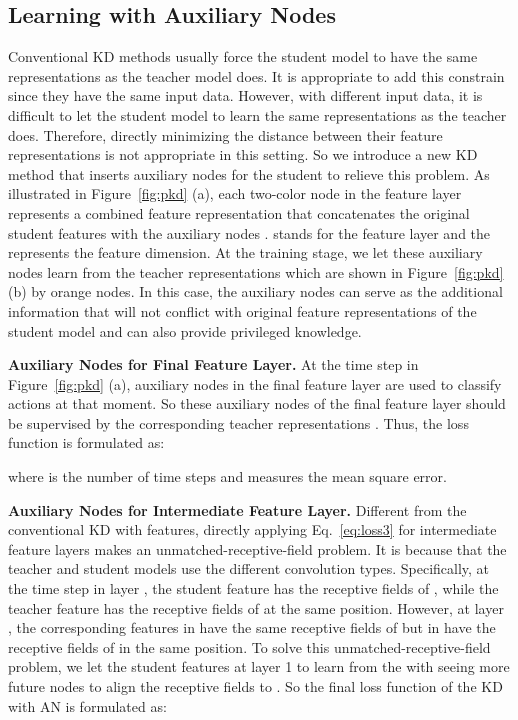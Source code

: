 \documentclass[final]{cvpr}
\begin{document}
\subsection{Learning with Auxiliary Nodes}

Conventional KD methods usually force the student model to have the same representations as the teacher model does. It is appropriate to add this constrain since they have the same input data. However, with different input data, it is difficult to let the student model  to learn the same representations as the teacher does. Therefore, directly minimizing the distance between their feature representations is not appropriate in this setting. So we introduce a new KD method that inserts auxiliary nodes for the student to relieve this problem. As illustrated in Figure~\ref{fig:pkd} (a), each two-color node in the feature layer represents a combined feature representation that concatenates the original student features  with the auxiliary nodes .  stands for the feature layer and the  represents the feature dimension. At the training stage, we let these auxiliary nodes learn from the teacher representations  which are shown in Figure~\ref{fig:pkd} (b) by orange nodes. In this case, the auxiliary nodes can serve as the additional information that will not conflict with original feature representations of the student model and can also provide privileged knowledge. 

\noindent \textbf{Auxiliary Nodes for Final Feature Layer.} 
At the time step  in Figure~\ref{fig:pkd} (a), auxiliary nodes  in the final feature layer are used to classify actions at that moment. So these auxiliary nodes of the final feature layer should be supervised by the corresponding teacher representations . Thus, the loss function is formulated as:

where  is the number of time steps and  measures the mean square error.

\noindent \textbf{Auxiliary Nodes for Intermediate Feature Layer.} 
Different from the conventional KD with features, directly applying Eq.~\eqref{eq:loss3} for intermediate feature layers makes an unmatched-receptive-field problem. It is because that the teacher and student models use the different convolution types. Specifically, at the time step  in layer , the student feature  has the receptive fields of , while the teacher feature  has the receptive fields of  at the same position. However, at layer , the corresponding features  in  have the same receptive fields of  but  in  have the receptive fields of  in the same position. To solve this unmatched-receptive-field problem, we let the student features  at layer 1 to learn from the  with seeing more future nodes to align the receptive fields to . So the final loss function of the KD with AN is formulated as:
\end{document}
